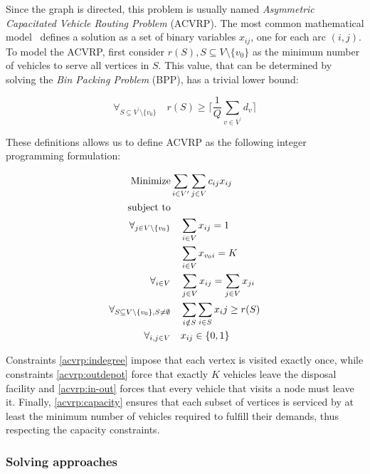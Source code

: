 Since the graph is directed, this problem is usually named \textit{Asymmetric
Capacitated Vehicle Routing Problem} (ACVRP). The most common mathematical
model~\citep{Toth01} defines a solution as a set of binary variables $x_{ij}$,
one for each arc $(i, j)$. To model the ACVRP, first consider $r(S), S
\subseteq V \setminus \{v_0\}$ as the minimum number of vehicles to serve all
vertices in $S$. This value, that can be determined by solving the \textit{Bin
Packing Problem} (BPP), has a trivial lower bound:

\begin{equation}
\forall_{S \subseteq V^\prime \setminus \{v_0\}} \quad r(S) \geq
\lceil\frac{1}{Q} \sum_{v \in V^\prime} d_{v} \rceil
\end{equation}

These definitions allows us to define ACVRP as the following integer
programming formulation:

\begin{align}
	\mbox{Minimize} & \sum_{i \in V^\prime} \sum_{j \in V} c_{ij} x_{ij}
	\\
	\mbox{subject to} & \notag{}
	\\
	\forall_{j \in V \setminus \{v_0\}} & \quad \sum_{i \in V} x_{ij} = 1
	\label{acvrp:indegree}
	\\
	& \quad \sum_{i \in V} x_{v_0i} = K
	\label{acvrp:outdepot}
	\\
	\forall_{i \in V} & \quad \sum_{j \in V} x_{ij} = \sum_{j \in V} x_{ji}
	\label{acvrp:in-out}
	\\
	\forall_{S \subseteq V \setminus \{v_0\}, S \neq \emptyset} & \quad
	\sum_{i \notin S} \sum_{i \in S} x_ij \geq r(S)
	\label{acvrp:capacity}
	\\
	\forall_{i, j \in V} & \quad x_{ij} \in \{0, 1\}
\end{align}

Constraints \eqref{acvrp:indegree} impose that each vertex is visited exactly
once, while constraints \eqref{acvrp:outdepot} force that exactly $K$ vehicles
leave the disposal facility and \eqref{acvrp:in-out} forces that every vehicle
that visits a node must leave it. Finally, \eqref{acvrp:capacity} ensures that
each subset of vertices is serviced by at least the minimum number of vehicles
required to fulfill their demands, thus respecting the capacity constraints.




\subsubsection{Solving approaches}
\label{section:vrp-approaches}

